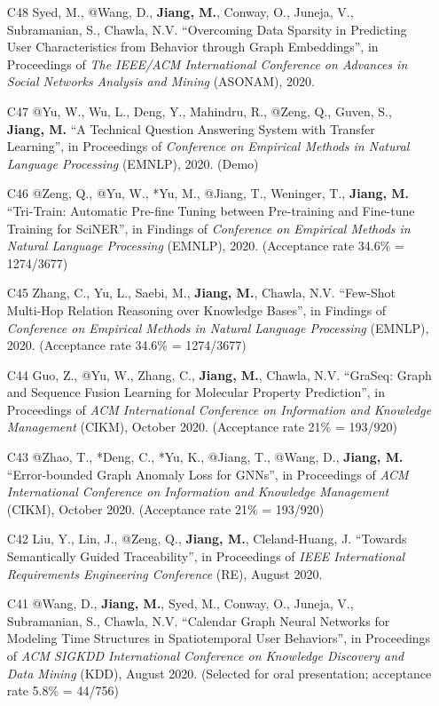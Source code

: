 \documentclass[10pt]{article}
\newenvironment{myindentpar}[1]%
{\begin{list}{}%
         {\setlength{\leftmargin}{#1}}%
         \item[]%
}
{\end{list}}
\newcounter{list}
\begin{document}
\begin{myindentpar}{0.00cm}
\begin{enumerate}[leftmargin=.5cm]
\item[C48] Syed, M., @Wang, D., \textbf{Jiang, M.}, Conway, O., Juneja, V., Subramanian, S., Chawla, N.V. ``Overcoming Data Sparsity in Predicting User Characteristics from Behavior through Graph Embeddings'', in Proceedings of \textit{The IEEE/ACM International Conference on Advances in Social Networks Analysis and Mining} (ASONAM), 2020.

\item[C47] @Yu, W., Wu, L., Deng, Y., Mahindru, R., @Zeng, Q., Guven, S., \textbf{Jiang, M.} ``A Technical Question Answering System with Transfer Learning'', in Proceedings of \textit{Conference on Empirical Methods in Natural Language Processing} (EMNLP), 2020. (Demo)
		
\item[C46] @Zeng, Q., @Yu, W., *Yu, M., @Jiang, T., Weninger, T., \textbf{Jiang, M.} ``Tri-Train: Automatic Pre-fine Tuning between Pre-training and Fine-tune Training for SciNER'', in Findings of \textit{Conference on Empirical Methods in Natural Language Processing} (EMNLP), 2020. (Acceptance rate 34.6\% = 1274/3677)

\item[C45] Zhang, C., Yu, L., Saebi, M., \textbf{Jiang, M.}, Chawla, N.V. ``Few-Shot Multi-Hop Relation Reasoning over Knowledge Bases'', in Findings of \textit{Conference on Empirical Methods in Natural Language Processing} (EMNLP), 2020. (Acceptance rate 34.6\% = 1274/3677)

\item[C44] Guo, Z., @Yu, W., Zhang, C., \textbf{Jiang, M.}, Chawla, N.V. ``GraSeq: Graph and Sequence Fusion Learning for Molecular Property Prediction'', in Proceedings of \textit{ACM International Conference on Information and Knowledge Management} (CIKM), October 2020. (Acceptance rate 21\% = 193/920)
		
\item[C43] @Zhao, T., *Deng, C., *Yu, K., @Jiang, T., @Wang, D., \textbf{Jiang, M.} ``Error-bounded Graph Anomaly Loss for GNNs'', in Proceedings of \textit{ACM International Conference on Information and Knowledge Management} (CIKM), October 2020. (Acceptance rate 21\% = 193/920)

\item[C42] Liu, Y., Lin, J., @Zeng, Q., \textbf{Jiang, M.}, Cleland-Huang, J. ``Towards Semantically Guided Traceability'', in Proceedings of \textit{IEEE International Requirements Engineering Conference} (RE), August 2020.	

\item[C41] @Wang, D., \textbf{Jiang, M.}, Syed, M., Conway, O., Juneja, V., Subramanian, S., Chawla, N.V. ``Calendar Graph Neural Networks for Modeling Time Structures in Spatiotemporal User Behaviors'', in Proceedings of \textit{ACM SIGKDD International Conference on Knowledge Discovery and Data Mining} (KDD), August 2020. (Selected for oral presentation; acceptance rate 5.8\% = 44/756)


\end{enumerate}
\end{myindentpar}
\end{document}
